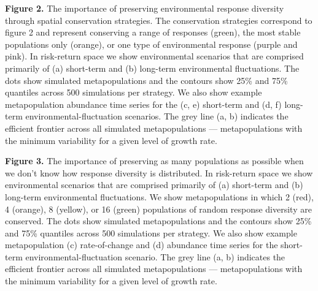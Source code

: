 \documentclass[11pt]{article}
\begin{document}
\begin{spacing}{1.6}

\textbf{Figure 2.} The importance of preserving environmental response diversity through spatial conservation strategies. The conservation strategies correspond to figure 2 and represent conserving a range of responses (green), the most stable populations only (orange), or one type of environmental response (purple and pink). In risk-return space we show environmental scenarios that are comprised primarily of (a) short-term and (b) long-term environmental fluctuations. The dots show simulated metapopulations and the contours show 25\% and 75\% quantiles across 500 simulations per strategy. We also show example metapopulation abundance time series for the (c, e) short-term and (d, f) long-term environmental-fluctuation scenarios. The grey line (a, b) indicates the efficient frontier across all simulated metapopulations --- metapopulations with the minimum variability for a given level of growth rate.


\textbf{Figure 3.} The importance of preserving as many populations as possible when we don't know how response diversity is distributed. In risk-return space we show environmental scenarios that are comprised primarily of (a) short-term and (b) long-term environmental fluctuations. We show metapopulations in which 2 (red), 4 (orange), 8 (yellow), or 16 (green) populations of random response diversity are conserved. The dots show simulated metapopulations and the contours show 25\% and 75\% quantiles across 500 simulations per strategy. We also show example metapopulation (c) rate-of-change and (d) abundance time series for the short-term environmental-fluctuation scenario. The grey line (a, b) indicates the efficient frontier across all simulated metapopulations --- metapopulations with the minimum variability for a given level of growth rate.

\clearpage

\end{spacing}




\end{document}
